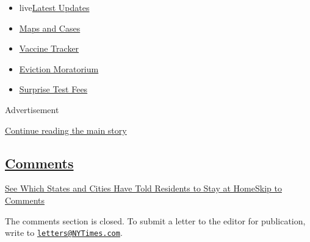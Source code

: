 \begin{itemize}
\tightlist
\item
  live\href{https://www.nytimes3xbfgragh.onion/2020/09/09/world/covid-19-coronavirus.html?name=styln-coronavirus-national\&region=TOP_BANNER\&block=storyline_menu_recirc\&action=click\&pgtype=Interactive\&impression_id=dadc2201-f2ba-11ea-841f-fb518d5e9681\&variant=undefined}{Latest
  Updates}
\item
  \href{https://www.nytimes3xbfgragh.onion/interactive/2020/us/coronavirus-us-cases.html?name=styln-coronavirus-national\&region=TOP_BANNER\&block=storyline_menu_recirc\&action=click\&pgtype=Interactive\&impression_id=dadc2202-f2ba-11ea-841f-fb518d5e9681\&variant=undefined}{Maps
  and Cases}
\item
  \href{https://www.nytimes3xbfgragh.onion/interactive/2020/science/coronavirus-vaccine-tracker.html?name=styln-coronavirus-national\&region=TOP_BANNER\&block=storyline_menu_recirc\&action=click\&pgtype=Interactive\&impression_id=dadc4910-f2ba-11ea-841f-fb518d5e9681\&variant=undefined}{Vaccine
  Tracker}
\item
  \href{https://www.nytimes3xbfgragh.onion/2020/09/02/your-money/eviction-moratorium-covid.html?name=styln-coronavirus-national\&region=TOP_BANNER\&block=storyline_menu_recirc\&action=click\&pgtype=Interactive\&impression_id=dadc4911-f2ba-11ea-841f-fb518d5e9681\&variant=undefined}{Eviction
  Moratorium}
\item
  \href{https://www.nytimes3xbfgragh.onion/2020/09/09/upshot/coronavirus-surprise-test-fees.html?name=styln-coronavirus-national\&region=TOP_BANNER\&block=storyline_menu_recirc\&action=click\&pgtype=Interactive\&impression_id=dadc4912-f2ba-11ea-841f-fb518d5e9681\&variant=undefined}{Surprise
  Test Fees}
\end{itemize}

Advertisement

\protect\hyperlink{after-top}{Continue reading the main story}

\hypertarget{comments}{%
\subsection{\texorpdfstring{\protect\hyperlink{commentsContainer}{Comments}}{Comments}}\label{comments}}

\href{}{See Which States and Cities Have Told Residents to Stay at
Home}\href{}{Skip to Comments}

The comments section is closed. To submit a letter to the editor for
publication, write to
\href{mailto:letters@NYTimes.com}{\nolinkurl{letters@NYTimes.com}}.

